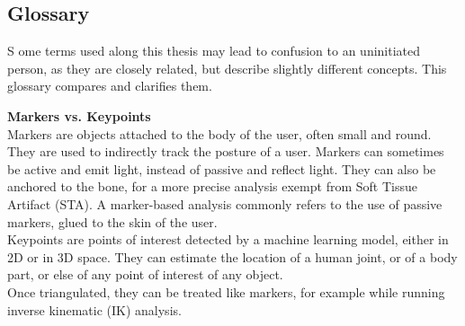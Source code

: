 
{} \mtcaddchapter
\label{Ann:gloss}

\vspace*{-1.6cm}
\begin{flushright}
\section*{\fontsize{20pt}{20pt}\selectfont\textnormal{Glossary}}
\end{flushright}
\vspace{-0.2cm}


\chead[\fancyplain{}{}]
      {\fancyplain{}{}}
\lfoot[\fancyplain{}{}]
      {\fancyplain{}{}}
\cfoot[\fancyplain{}{\thepage}]
      {\fancyplain{}{\thepage}}
\rfoot[\fancyplain{}{}]%
     {\fancyplain{}{\scriptsize}}


\lettrine[lines=1]{S}{ }ome terms used along this thesis may lead to confusion to an uninitiated person, as they are closely related, but describe slightly different concepts. This glossary compares and clarifies them.

\vspace*{1cm}

\noindent\textbf{Markers vs. Keypoints}\\
Markers are objects attached to the body of the user, often small and round. They are used to indirectly track the posture of a user. Markers can sometimes be active and emit light, instead of passive and reflect light. They can also be anchored to the bone, for a more precise analysis exempt from Soft Tissue Artifact (STA). A marker-based analysis commonly refers to the use of passive markers, glued to the skin of the user.\\
Keypoints are points of interest detected by a machine learning model, either in 2D or in 3D space. They can estimate the location of a human joint, or of a body part, or else of any point of interest of any object.\\
Once triangulated, they can be treated like markers, for example while running inverse kinematic (IK) analysis.


